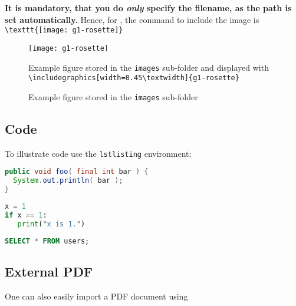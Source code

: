 \textbf{It is mandatory, that you do \emph{only} specify the filename, as the path is set automatically.} Hence, for , the command to include the image is \verb|\texttt{[image: g1-rosette]}|

\begin{figure}[!ht]
\centering
\texttt{[image: g1-rosette]}
\caption{Example figure stored in the \texttt{images} sub-folder and displayed with \texttt{\textbackslash includegraphics[width=0.45\textbackslash textwidth]\{g1-rosette\}}}
\label{fig:rosette}
\end{figure}

\begin{figure}[H]
\centering
    \qquad
\caption{Example figure stored in the \texttt{images} sub-folder}
\label{fig:example subfigure}
\end{figure}


\subsection*{Code}
To illustrate code use the \texttt{lstlisting} environment:

\begin{lstlisting}[language={Java}, label={lst:javaexample}, captionpos=b, caption={Example for Java}]
public void foo( final int bar ) {
  System.out.println( bar );
}
\end{lstlisting}


\begin{lstlisting}[language={Python}, label={lst:pythonexample}, captionpos=b, caption={Example for Python}]
x = 1
if x == 1:
   print("x is 1.")
\end{lstlisting}


\begin{lstlisting}[language={SQL}, label={lst:sqlexample}, captionpos=b, caption={Example for SQL}]
SELECT * FROM users;
\end{lstlisting}


\subsection*{External PDF}
One can also easily import a PDF document using\smallskip

